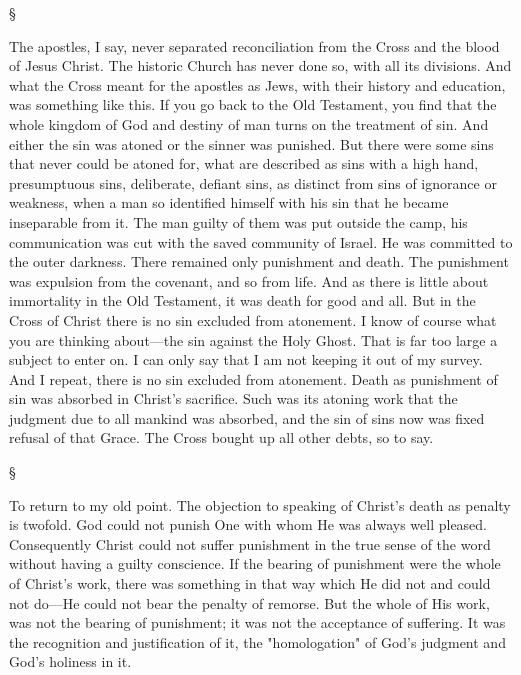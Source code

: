 \documentclass[12pt,a5paper,twoside,titlepage]{book}
\begin{document}
\begin{center}
\S
\end{center}


The apostles, I say, never separated reconciliation 
from the Cross and the blood of Jesus 
Christ. The historic Church has never done so, 
with all its divisions. And what the Cross 
meant for the apostles as Jews, with their history 
and education, was something like this. If 
you go back to the Old Testament, you find 
that the whole kingdom of God and destiny of 
man turns on the treatment of sin. And either 
the sin was atoned or the sinner was punished. 
But there were some sins that never could be 
atoned for, what are described as sins with 
a high hand, presumptuous sins, deliberate, 
defiant sins, as distinct from sins of ignorance 
or weakness, when a man so identified himself 
with his sin that he became inseparable from 
it. The man guilty of them was put outside 
the camp, his communication was cut with the 
saved community of Israel. He was committed 
to the outer darkness. There remained only 
punishment and death. The punishment was 
expulsion from the covenant, and so from life. 
And as there is little about immortality in 
the Old Testament, it was death for good and 
all. But in the Cross of Christ there is no 
sin excluded from atonement. I know of 
course what you are thinking about---the sin 
against the Holy Ghost. That is far too large 
a subject to enter on. I can only say that 
I am not keeping it out of my survey. 
And I repeat, there is no sin excluded from 
atonement. Death as punishment of sin was 
absorbed in Christ's sacrifice. Such was its 
atoning work that the judgment due to all 
mankind was absorbed, and the sin of sins 
now was fixed refusal of that Grace. The 
Cross bought up all other debts, so to say. 

\begin{center}
\S
\end{center}

To return to my old point. The objection to 
speaking of Christ's death as penalty is twofold. 
God could not punish One with whom 
He was always well pleased. Consequently 
Christ could not suffer punishment in the true 
sense of the word without having a guilty 
conscience. If the bearing of punishment were 
the whole of Christ's work, there was something 
in that way which He did not and could not do---He 
could not bear the penalty of remorse. But 
the whole of His work, was not the bearing of 
punishment; it was not the acceptance of suffering. 
It was the recognition and justification of 
it, the "homologation" of God's judgment and 
God's holiness in it. 
\end{document}

